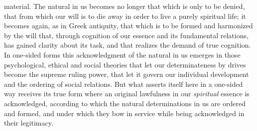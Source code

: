 \documentclass[12pt,a4paper,openany]{book}
\newcommand{\opage}[1]{\marginnote{\footnotesize\textit{[#1]}}}
\begin{document}
material. The natural in us becomes no
\opage{494}longer that which is only to be denied, that from which our will
is to die away in order to live a purely spiritual life; it
becomes again, as in Greek antiquity, that which is to be formed
and harmonized by the will that, through cognition of our essence
and its fundamental relations, has gained clarity about its task,
and that realizes the demand of true cognition. In one-sided forms
this acknowledgment of the natural in us emerges in those
psychological, ethical and social theories that let our
determinateness by drives become the supreme ruling power, that let
it govern our individual development and the ordering of social
relations. But what asserts itself here in a one-sided way receives
its true form where an original lawfulness in our \emph{spiritual}
essence is acknowledged, according to which the natural
determinations in us are ordered and formed, and under which they
bow in service while being acknowledged in their
legitimacy.
\end{document}
